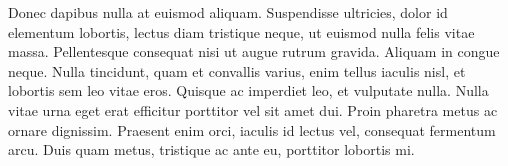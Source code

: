 Donec dapibus nulla at euismod aliquam. Suspendisse ultricies, dolor id elementum lobortis, lectus diam tristique neque, ut euismod nulla felis vitae massa. Pellentesque consequat nisi ut augue rutrum gravida. Aliquam in congue neque. Nulla tincidunt, quam et convallis varius, enim tellus iaculis nisl, et lobortis sem leo vitae eros. Quisque ac imperdiet leo, et vulputate nulla. Nulla vitae urna eget erat efficitur porttitor vel sit amet dui. Proin pharetra metus ac ornare dignissim. Praesent enim orci, iaculis id lectus vel, consequat fermentum arcu. Duis quam metus, tristique ac ante eu, porttitor lobortis mi.


